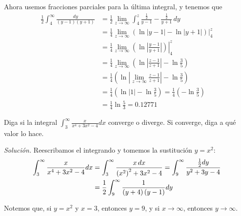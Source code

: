 Ahora usemos fracciones parciales para la última integral, y tenemos que
\begin{align*}
  \frac{1}{2}\int_{4}^{\infty }\frac{dy}{\left( y-1\right) \left( y+1\right)} &=\frac{1}{2}\lim_{z\rightarrow \infty }\int_{4}^{z} \frac{\frac{1}{2}}{y-1}-\frac{\frac{1}{2}}{y+1}\, dy \\
  &=\frac{1}{4}\lim_{z\rightarrow \infty }\left( \ln \left\vert y-1\right\vert
  -\ln \left\vert y+1\right\vert \right)\big\vert_{4}^{z} \\
  &=\frac{1}{4}\left.\lim_{z\rightarrow \infty }\left( \ln \left\vert \frac{y-1}{y+1}\right\vert \right)\right\vert_{4}^{z} \\
  &=\frac{1}{4}\lim_{z\rightarrow \infty }\left( \ln \left\vert \frac{z-1}{z+1}%
  \right\vert -\ln \frac{3}{5}\right) \\
  &=\frac{1}{4}\left( \ln \left\vert \lim_{z\rightarrow \infty }\frac{z-1}{z+1}%
  \right\vert -\ln \frac{3}{5}\right) \\
  &=\frac{1}{4}\left( \ln \left\vert 1\right\vert -\ln \frac{3}{5}\right) =%
  \frac{1}{4}\left( -\ln \frac{3}{5}\right) \\
  &=\frac{1}{4}\ln \frac{5}{3}=0.12771
\end{align*}

\begin{ejemplo}
  Diga si la integral $\int_{3}^{\infty}\frac{x}{x^{4}+3x^{2}-4}dx$ converge o diverge. Si converge, diga a qué valor lo hace.
\end{ejemplo}

\emph{Solución.} Reescribamos el integrando y tomemos la sustitución $y=x^2$:
\begin{align*}
  \int_{3}^{\infty}\frac{x}{x^{4}+3x^{2}-4}dx&=\int_{3}^{\infty }\frac{x\,dx}{%
  \left( x^{2}\right) ^{2}+3x^{2}-4}
  =\int_{9}^{\infty }\frac{\frac{1}{2}dy}{y^{2}+3y-4} \\
  &=\frac{1}{2}%
  \int_{9}^{\infty }\frac{1}{\left( y+4\right) \left( y-1\right) }dy
\end{align*}

Notemos que, si $y=x^2$ y $x=3$, entonces $y=9$, y si $x\to\infty$, entonces $y\to\infty$.

